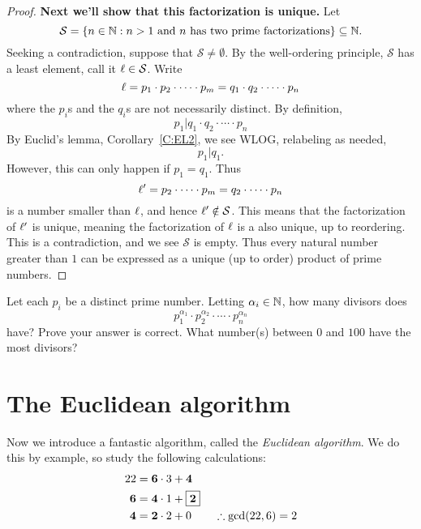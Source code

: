 \documentclass{ximera}
\begin{document}
\begin{corollary}
\begin{proof}
      \textbf{Next we'll show that this factorization is unique.}
      Let 
      \[
      \mathcal{S} = \{n\in\mathbb N: \text{$n>1$ and $n$ has two prime
        factorizations}\}\subseteq \mathbb N.
       \]
      Seeking a contradiction, suppose that $\mathcal{S} \ne
      \emptyset$. By the well-ordering
      principle, $\mathcal{S}$ has a least element, call it $\ell\in
      \mathcal{S}$. Write
      \[
      \ell = p_1 \cdot p_2 \cdot \cdots \cdot p_m = q_1 \cdot q_2 \cdot \cdots \cdot p_n
      \]
      where the $p_i$s and the $q_i$s are not necessarily distinct.
      By definition,
      \[
      p_1 |   q_1 \cdot q_2 \cdot \cdots \cdot p_n
      \]
      By Euclid's lemma, Corollary~\ref{C:EL2}, we see WLOG,
      relabeling as needed,
      \[
      p_1 | q_1.
      \]
      However, this can only happen if $p_1 = q_1$. Thus
      \[
      \ell' = p_2 \cdot \cdots \cdot p_m = q_2 \cdot \cdots \cdot p_n
      \]
      is a number smaller than $\ell$, and hence
      $\ell'\notin\mathcal{S}$. This means that the factorization of
      $\ell'$ is unique, meaning the factorization of $\ell$ is a also
      unique, up to reordering. This is a contradiction, and we see
      $\mathcal{S}$ is empty. Thus every natural number greater than
      $1$ can be expressed as a unique (up to order) product of prime
      numbers.
  \end{proof}
\end{corollary}


\begin{exercise}
  Let each $p_i$ be a distinct prime number.  Letting $\alpha_i\in
  \mathbb N$, how many divisors does
  \[
  p_1^{\alpha_1} \cdot p_2^{\alpha_2} \cdot \cdots \cdot p_n^{\alpha_n}
  \]
  have? Prove your answer is correct. What number(s) between $0$ and
  $100$ have the most divisors?
\end{exercise}





\section{The Euclidean algorithm}

Now we introduce a fantastic algorithm, called the \textit{Euclidean
  algorithm}. We do this by example, so study the following
calculations:
\begin{align*}
  22 &= \boldsymbol{6}\cdot 3 + \boldsymbol{4}\\
  \boldsymbol{6} &= \boldsymbol{4} \cdot 1 + \fbox{$\boldsymbol{2}$}\\
  \boldsymbol{4} &= \boldsymbol{2} \cdot 2 + 0 \qquad
\therefore \gcd(22,6) = 2
\end{align*}
\end{document}
